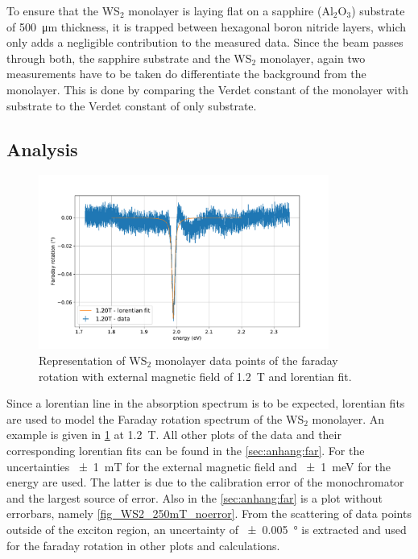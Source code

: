 To ensure that the WS$_2$ monolayer is laying flat on a sapphire ($\text{Al}_2\text{O}_3$) substrate of \SI{500}{\micro\meter} thickness, it is trapped between hexagonal boron nitride layers, which only adds a negligible contribution to the measured data. %
Since the beam passes through both, the sapphire substrate and the WS$_2$ monolayer, again two measurements have to be taken do differentiate the background from the monolayer.
This is done by comparing the Verdet constant of the monolayer with substrate to the Verdet constant of only substrate.

\subsection{Analysis}

\begin{figure}[!ht]
    \centering
    \includegraphics[width=0.85\textwidth]{plots/WS2_1200mT.pdf}
    \caption{Representation of WS$_2$ monolayer data points of the faraday rotation with external magnetic field of \SI{1.2}{\tesla} and lorentian fit.}
    \label{fig_WS2_1200mT}
\end{figure}
Since a lorentian line in the absorption spectrum is to be expected, lorentian fits are used to model the Faraday rotation spectrum of the WS$_2$ monolayer.
An example is given in \cref{fig_WS2_1200mT} at \SI{1.2}{\tesla}.
All other plots of the data and their corresponding lorentian fits can be found in the \cref{sec:anhang:far}.
For the uncertainties \SI{+-1}{\milli\tesla} for the external magnetic field and \SI{+-1}{\milli\electronvolt} for the energy are used.
The latter is due to the calibration error of the monochromator and the largest source of error.
Also in the \cref{sec:anhang:far} is a plot without errorbars, namely \cref{fig_WS2_250mT_noerror}.
From the scattering of data points outside of the exciton region, an uncertainty of \SI{+-0.005}{\degree} is extracted and used for the faraday rotation in other plots and calculations.

